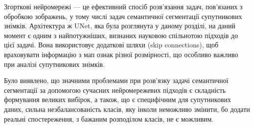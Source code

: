 Згорткові нейромережі --- це ефективний спосіб розв'язання задач,
пов'язаних з обробкою зображень, у тому числі задач семантичної
сегментації супутникових знімків. Архітектура ж UNet, яка була
розглянута у даному розділі, на даний момент є одним з найпотужніших,
визнаних науковою спільнотою підходів до цієї задачі. Вона використовує додаткові шляхи
(skip connections), щоб враховувати інформацію з мап ознак різної розмірності,
що особливо важливо при аналізі супутникових знімків.

Було виявлено, що значними проблемами при
розв'язку задачі семантичної сегментації за
допомогою сучасних нейромережевих підходів є
складність формування великих вибірок, а також,
що є специфічним для супутникових даних, сильна
незбалансованість класів, яку інколи неможливо
змінити, бо додати реальні спостереження,
з бажаним розподілом класів, не є можливим.
